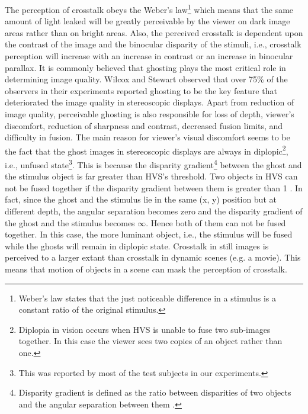 The perception of crosstalk obeys the Weber's law\footnote{Weber's law states that the just noticeable difference in a stimulus is a constant ratio of the original stimulus.} which means that the same amount of light leaked will be greatly perceivable by the viewer on dark image areas rather than on bright areas. Also, the perceived crosstalk is dependent upon the contrast of the image and the binocular disparity of the stimuli, i.e., crosstalk perception will increase with an increase in contrast or an increase in binocular parallax. It is commonly believed that ghosting plays the most critical role in determining image quality. Wilcox and Stewart\cite{wilcox2003determinants} observed that over 75\% of the observers in their experiments reported ghosting to be the key feature that deteriorated the image quality in stereoscopic displays. Apart from reduction of image quality, perceivable ghosting is also responsible for loss of depth, viewer's discomfort, reduction of sharpness and contrast, decreased fusion limits, and difficulty in fusion. The main reason for viewer's visual discomfort seems to be the fact that the ghost images in stereoscopic displays are always in diplopic\footnote{Diplopia in vision occurs when HVS is unable to fuse two sub-images together. In this case the viewer sees two copies of an object rather than one.}, i.e., unfused state\footnote{This was reported by most of the test subjects in our experiments.}. This is because the disparity gradient\footnote{Disparity gradient is defined as the ratio between disparities of two objects and the angular separation between them \cite{filippini2009limits}.} between the ghost and the stimulus object is far greater than HVS's threshold. Two objects in HVS can not be fused together if the disparity gradient between them is greater than 1 \cite{burt1980disparity}. In fact, since the ghost and the stimulus lie in the same (x, y) position but at different depth, the angular separation becomes zero and the disparity gradient of the ghost and the stimulus becomes $\infty$. Hence both of them can not be fused together. In this case, the more luminant object, i.e., the stimulus will be fused while the ghosts will remain in diplopic state. Crosstalk in still images is perceived to a larger extant than crosstalk in dynamic scenes (e.g. a movie). This means that motion of objects in a scene can mask the perception of crosstalk.

